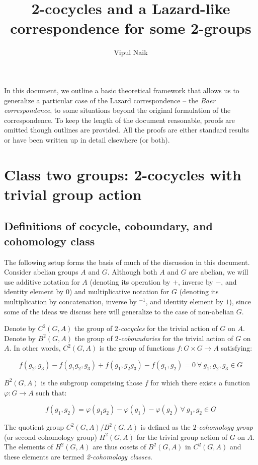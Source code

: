 \documentclass[10pt]{amsart}
\title{2-cocycles and a Lazard-like correspondence for some 2-groups}
\author{Vipul Naik}
\begin{document}
\maketitle

In this document, we outline a basic theoretical framework that allows
us to generalize a particular case of the Lazard correspondence -- the
{\em Baer correspondence}, to some situations beyond the original
formulation of the correspondence. To keep the length of the document
reasonable, proofs are omitted though outlines are provided. All the
proofs are either standard results or have been written up in detail
elsewhere (or both).

\section{Class two groups: 2-cocycles with trivial group action}

\subsection{Definitions of cocycle, coboundary, and cohomology class}

The following setup forms the basis of much of the discussion in this
document. Consider abelian groups $A$ and $G$. Although both $A$ and
$G$ are abelian, we will use additive notation for $A$ (denoting its
operation by $+$, inverse by $-$, and identity element by $0$) and
multiplicative notation for $G$ (denoting its multiplication by
concatenation, inverse by ${}^{-1}$, and identity element by $1$), since
some of the ideas we discuss here will generalize to the case of
non-abelian $G$.

Denote by $C^2(G,A)$ the group of {\em $2$-cocycles} for the trivial
action of $G$ on $A$. Denote by $B^2(G,A)$ the group of {\em
$2$-coboundaries} for the trivial action of $G$ on $A$. In other
words, $C^2(G,A)$ is the group of functions $f:G \times G \to A$
satisfying:

$$f(g_2,g_3) - f(g_1g_2,g_3) + f(g_1,g_2g_3) - f(g_1,g_2) = 0 \ \forall \ g_1,g_2,g_3 \in G$$

$B^2(G,A)$ is the subgroup comprising those $f$ for which there exists
a function $\varphi:G \to A$ such that:

$$f(g_1,g_2) = \varphi(g_1g_2) - \varphi(g_1) - \varphi(g_2) \ \forall \ g_1, g_2 \in G$$

The quotient group $C^2(G,A)/B^2(G,A)$ is defined as the {\em
$2$-cohomology group} (or second cohomology group) $H^2(G,A)$ for the
trivial group action of $G$ on $A$. The elements of $H^2(G,A)$ are
thus cosets of $B^2(G,A)$ in $C^2(G,A)$ and these elements are termed
{\em 2-cohomology classes}.
\end{document}
